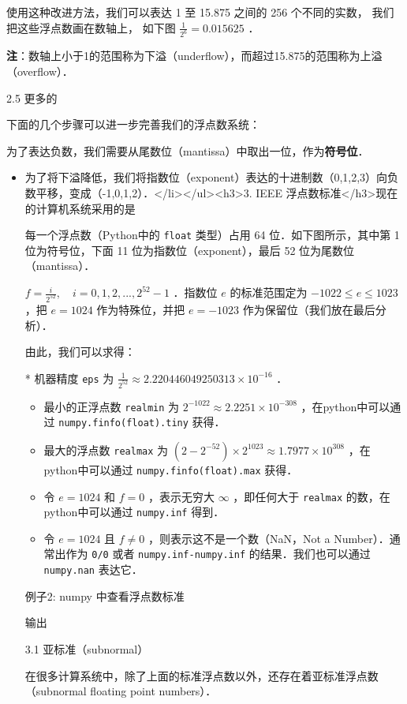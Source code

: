 使用这种改进方法，我们可以表达 1 至 15.875 之间的 256 个不同的实数， 我们把这些浮点数画在数轴上， 如下图 $\frac{1}{2^6}=0.015625$  ．

\textbf{注}：数轴上小于1的范围称为下溢（underflow），而超过15.875的范围称为上溢（overflow）．

2.5 更多的

下面的几个步骤可以进一步完善我们的浮点数系统：

为了表达负数，我们需要从尾数位（mantissa）中取出一位，作为\textbf{符号位}． 

\begin{itemize}
\item 为了将下溢降低，我们将指数位（exponent）表达的十进制数（0,1,2,3）向负数平移，变成（-1,0,1,2）．</li></ul><h3>3. IEEE 浮点数标准</h3>现在的计算机系统采用的是

每一个浮点数（Python中的 \verb|float| 类型）占用 64 位．如下图所示，其中第 1 位为符号位，下面 11 位为指数位（exponent），最后 52 位为尾数位（mantissa）．

$f=\frac{i}{2^{52}},\quad i=0,1,2,...,2^{52}-1$  ．指数位  $e$  的标准范围定为  $-1022\le e\le 1023$  ，把  $e=1024$  作为特殊位，并把  $e=-1023$  作为保留位（我们放在最后分析）．

由此，我们可以求得：

* 机器精度 \verb|eps| 为  $\frac{1}{2^{52}}\approx 2.220446049250313\times10^{-16}$  ．

\begin{itemize}
\item 最小的正浮点数 \verb|realmin| 为  $2^{-1022}\approx2.2251\times10^{-308}$  ，在python中可以通过 \verb|numpy.finfo(float).tiny| 获得．
\item 最大的浮点数 \verb|realmax| 为 $(2-2^{-52})\times2^{1023}\approx1.7977\times10^{308}$  ，在python中可以通过 \verb|numpy.finfo(float).max| 获得．
\item 令  $e=1024$  和  $f=0$  ，表示无穷大  $\infty$  ，即任何大于 \verb|realmax| 的数，在python中可以通过 \verb|numpy.inf| 得到．
\item 令  $e=1024$  且  $f\neq0$  ，则表示这不是一个数（NaN，Not a Number）．通常出作为 \verb|0/0| 或者 \verb|numpy.inf-numpy.inf| 的结果．我们也可以通过 \verb|numpy.nan| 表达它．
\end{itemize}

例子2: numpy 中查看浮点数标准

输出

3.1 亚标准（subnormal）

在很多计算系统中，除了上面的标准浮点数以外，还存在着亚标准浮点数（subnormal floating point numbers）． 


\end{itemize}

